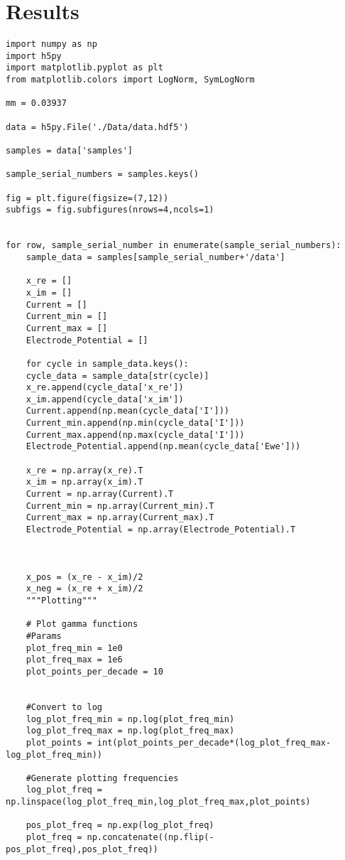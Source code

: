 \documentclass[11pt]{article}
\begin{document}
\section{Results}
\label{sec:org4a45003}

\begin{verbatim}
import numpy as np
import h5py
import matplotlib.pyplot as plt
from matplotlib.colors import LogNorm, SymLogNorm

mm = 0.03937

data = h5py.File('./Data/data.hdf5')

samples = data['samples']

sample_serial_numbers = samples.keys()

fig = plt.figure(figsize=(7,12))
subfigs = fig.subfigures(nrows=4,ncols=1)


for row, sample_serial_number in enumerate(sample_serial_numbers):
    sample_data = samples[sample_serial_number+'/data']

    x_re = []
    x_im = []
    Current = []
    Current_min = []
    Current_max = []
    Electrode_Potential = []

    for cycle in sample_data.keys():
	cycle_data = sample_data[str(cycle)]
	x_re.append(cycle_data['x_re'])
	x_im.append(cycle_data['x_im'])
	Current.append(np.mean(cycle_data['I']))
	Current_min.append(np.min(cycle_data['I']))
	Current_max.append(np.max(cycle_data['I']))
	Electrode_Potential.append(np.mean(cycle_data['Ewe']))

    x_re = np.array(x_re).T
    x_im = np.array(x_im).T
    Current = np.array(Current).T
    Current_min = np.array(Current_min).T
    Current_max = np.array(Current_max).T
    Electrode_Potential = np.array(Electrode_Potential).T



    x_pos = (x_re - x_im)/2
    x_neg = (x_re + x_im)/2
    """Plotting"""

    # Plot gamma functions
    #Params
    plot_freq_min = 1e0
    plot_freq_max = 1e6
    plot_points_per_decade = 10


    #Convert to log
    log_plot_freq_min = np.log(plot_freq_min)
    log_plot_freq_max = np.log(plot_freq_max)
    plot_points = int(plot_points_per_decade*(log_plot_freq_max-log_plot_freq_min))

    #Generate plotting frequencies
    log_plot_freq = np.linspace(log_plot_freq_min,log_plot_freq_max,plot_points)

    pos_plot_freq = np.exp(log_plot_freq)
    plot_freq = np.concatenate((np.flip(-pos_plot_freq),pos_plot_freq))



\end{verbatim}
\end{document}
